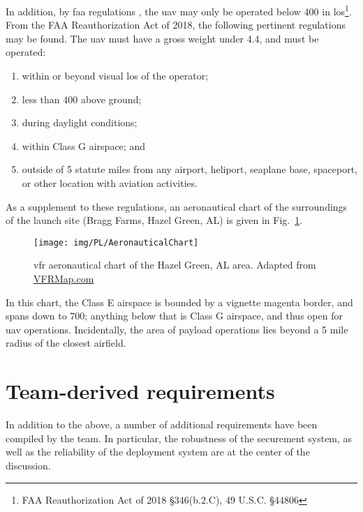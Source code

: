 	In addition, by \gls{faa} regulations \citep{FederalAviationAdministration2018}, the \gls{uav} may only be operated below \SI{400}{\feet} in \gls{los}\footnote{FAA Reauthorization Act of 2018 \S 346(b.2.C), 49 U.S.C. \S 44806}. From the FAA Reauthorization Act of 2018, the following pertinent regulations may be found. The \gls{uav} must have a gross weight under \SI{4.4}{\poundm}, and must be operated:

	\begin{enumerate}[noitemsep, label=(\roman*)]
		\item within or beyond visual \gls{los} of the operator;
		\item less than \SI{400}{\feet} above ground;
		\item during daylight conditions;
		\item within Class G airspace; and
		\item outside of 5 statute miles from any airport, heliport, seaplane base, spaceport, or other location with aviation activities.
	\end{enumerate}

	As a supplement to these regulations, an aeronautical chart of the surroundings of the launch site (Bragg Farms, Hazel Green, AL) is given in Fig.~\ref{fig:PL:Deployment:VFRchart}.

	\begin{figure}[H]
		\centering
		\texttt{[image: img/PL/AeronauticalChart]}
		\caption[VFR aeronautical chart of the Hazel Green, AL area]{\gls{vfr} aeronautical chart of the Hazel Green, AL area. Adapted from \href{http://vfrmap.com/}{VFRMap.com}}
		\label{fig:PL:Deployment:VFRchart}
	\end{figure}

	In this chart, the Class E airspace is bounded by a vignette magenta border, and spans down to \SI{700}{\feet}; anything below that is Class G airspace, and thus open for \gls{uav} operations. Incidentally, the area of payload operations lies beyond a 5 mile radius of the closest airfield.

\section{Team-derived requirements}\label{PL:Requirements:Ours}

	In addition to the above, a number of additional requirements have been compiled by the team. In particular, the robustness of the securement system, as well as the reliability of the deployment system are at the center of the discussion.

